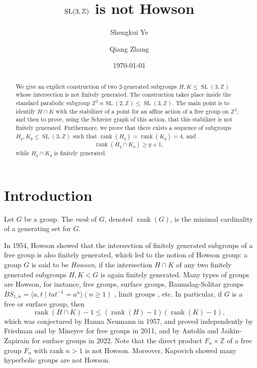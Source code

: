 \documentclass[]{amsart}
\title{ $\SL(3,\Z)$ is not Howson}
\date{\today}
\author{Shengkui Ye}
\author{Qiang Zhang}
\newtheorem*{fixed point criterion}{\fixed point criterion}
\theoremstyle{definition}
\theoremstyle{remark}
\numberwithin{equation}{section}
\newcommand{\SL}{\operatorname{SL}}
\newcommand{\Z}{\mathbb Z}
\newcommand{\rank}{\operatorname{rank}}
\begin{document}
\maketitle

\begin{abstract}
We give an explicit construction of two $2$-generated subgroups
$H,K\leq \SL(3,\Z)$ whose intersection is not finitely generated. The
construction takes place inside the standard parabolic subgroup
$\Z^2\rtimes \SL(2,\Z)\leq \SL(3,\Z)$. The main point is to identify
$H\cap K$ with the stabilizer of a point for an affine action of a free group
on $\Z^2$, and then to prove, using the Schreier graph of this action, that
this stabilizer is not finitely generated. Furthermore, we prove that there exists a sequence of subgroups $H_q, K_q \leq \SL(3,\mathbb{Z})$ such that $\rank(H_q)=\rank(K_q)=4$, and
\[
\rank(H_q\cap K_q)\geq q+1,
\] while $H_q\cap K_q$ is finitely generated.
\end{abstract}

\section{Introduction}
Let $G$ be a group.  The \emph{rank} of $G$, denoted
$\rank(G)$, is the minimal cardinality of a generating set for $G$.

In 1954,  Howson \cite{How54} showed that the intersection of finitely generated subgroups of a free group is also finitely generated, which led to the notion of Howson group: a group $G$ is said to be \textit{Howson}, if the intersection $H\cap K$ of any two finitely generated subgroups $H, K<G$ is again finitely generated. Many types of groups are Howson, for instance, free groups, surface groups, Baumslag-Solitar groups $BS_{1,n}=\langle a,t \mid tat^{-1}=a^n \rangle  (n\geq 1)$ \cite{Mol68}, limit groups  \cite{Dah03}, etc. In particular, if $G$ is a free or surface group, then
$$\rank(H\cap K)-1\leq (\rank(H)-1)(\rank(K)-1),$$
which was conjectured by Hanna Neumann in 1957, and proved independently by Friedman \cite{Fri14} and by Mineyev \cite{Min12} for free groups in 2011, and by Antol\'{i}n and Jaikin-Zapirain \cite{AJZ22} for surface groups in 2022. Note that the direct product $F_n \times \Z$ of a free group $F_n$ with rank $n>1$ is not Howson. Moreover, Kapovich \cite{Kap97} showed many hyperbolic groups are not Howson.
\end{document}
